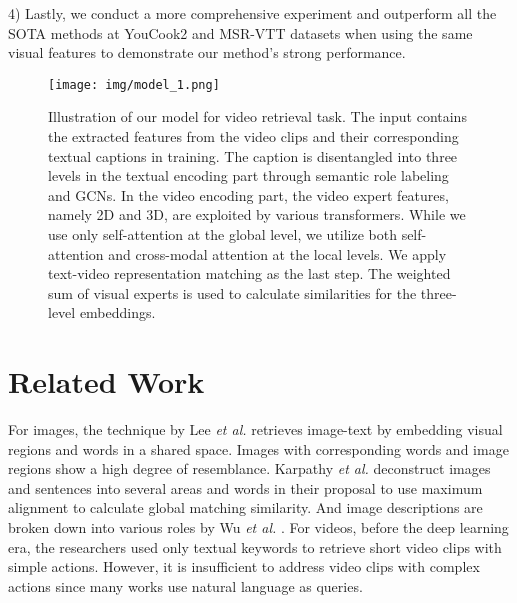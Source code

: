 \documentclass[lettersize,journal]{IEEEtran}
\begin{document}
4) Lastly, we conduct a more comprehensive experiment and outperform all the SOTA methods at YouCook2 and MSR-VTT datasets when using the same visual features to demonstrate our method's strong performance. 

\begin{figure*}[htb]
\centering
\centerline{\texttt{[image: img/model\_1.png]}}
\caption{ Illustration of our model for video retrieval task. The input contains the extracted features from the video clips and their corresponding textual captions in training. The caption is disentangled into three levels in the textual encoding part through semantic role labeling and GCNs. In the video encoding part, the video expert features, namely 2D and 3D, are exploited by various transformers. While we use only self-attention at the global level, we utilize both self-attention and cross-modal attention at the local levels. We apply text-video representation matching as the last step. The weighted sum of visual experts is used to calculate similarities for the three-level embeddings. }\vspace{-10pt}
\label{fig:model}
\end{figure*}













\section{Related Work}
For images, the technique by Lee \textit{et al.} \cite{lee2018stacked} retrieves image-text by embedding visual regions and words in a shared space. Images with corresponding words and image regions show a high degree of resemblance. Karpathy \textit{et al.} \cite{10.1109/TPAMI.2016.2598339} deconstruct images and sentences into several areas and words in their proposal to use maximum alignment to calculate global matching similarity. And image descriptions are broken down into various roles by Wu \textit{et al.} \cite{8954449}. For videos, before the deep learning era, the researchers \cite{Chang2015SemanticCD, Habibian2014CompositeCD} used only textual keywords to retrieve short video clips with simple actions. However, it is insufficient to address video clips with complex actions since many works use natural language as queries. 
\end{document}
